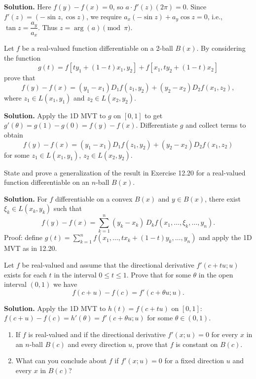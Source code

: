 \noindent\textbf{Solution.}
Here $f(y)-f(x)=0$, so $a\cdot f'(z)(2\pi)=0$. Since $f'(z)=(-\sin z,\cos z)$, we require $a_x(-\sin z)+a_y\cos z=0$, i.e., $\tan z=\dfrac{a_y}{a_x}$. Thus $z=\arg(a)\pmod{\pi}$.

\begin{problembox}
Let \( f \) be a real-valued function differentiable on a 2-ball \( B(x) \). By considering the function
\[g(t) = f[ty_1 + (1 - t)x_1, y_2] + f[x_1, ty_2 + (1 - t)x_2]\]
prove that
\[f(y) - f(x) = (y_1 - x_1)D_1f(z_1, y_2) + (y_2 - x_2)D_2f(x_1, z_2),\]
where \( z_1 \in L(x_1, y_1) \) and \( z_2 \in L(x_2, y_2) \).
\end{problembox}

\noindent\textbf{Solution.}
Apply the 1D MVT to $g$ on $[0,1]$ to get $g'(\theta)=g(1)-g(0)=f(y)-f(x)$. Differentiate $g$ and collect terms to obtain
\[f(y)-f(x)=(y_1-x_1)D_1 f(z_1,y_2)+(y_2-x_2)D_2 f(x_1,z_2)\]
for some $z_1\in L(x_1,y_1)$, $z_2\in L(x_2,y_2)$.

\begin{problembox}
State and prove a generalization of the result in Exercise 12.20 for a real-valued function differentiable on an \( n \)-ball \( B(x) \).
\end{problembox}

\noindent\textbf{Solution.}
For $f$ differentiable on a convex $B(x)$ and $y\in B(x)$, there exist $\xi_k\in L(x_k,y_k)$ such that
\[f(y)-f(x)=\sum_{k=1}^n (y_k-x_k)\,D_k f(x_1,\dots,\xi_k,\dots,y_n).\]
Proof: define $g(t)=\sum_{k=1}^n f(x_1,\dots,tx_k+(1-t)y_k,\dots,y_n)$ and apply the 1D MVT as in 12.20.

\begin{problembox}
Let \( f \) be real-valued and assume that the directional derivative \( f'(c + tu; u) \) exists for each \( t \) in the interval \( 0 \leq t \leq 1 \). Prove that for some \( \theta \) in the open interval \( (0, 1) \) we have
\[f(c + u) - f(c) = f'(c + \theta u; u).\]
\end{problembox}

\noindent\textbf{Solution.}
Apply the 1D MVT to $h(t)=f(c+tu)$ on $[0,1]$: $f(c+u)-f(c)=h'(\theta)=f'(c+\theta u;u)$ for some $\theta\in(0,1)$.

\begin{problembox}
\begin{enumerate}[label=(\alph*)]
\item If \( f \) is real-valued and if the directional derivative \( f'(x; u) = 0 \) for every \( x \) in an \( n \)-ball \( B(c) \) and every direction \( u \), prove that \( f \) is constant on \( B(c) \).
\item What can you conclude about \( f \) if \( f'(x; u) = 0 \) for a fixed direction \( u \) and every \( x \) in \( B(c) \)?
\end{enumerate}
\end{problembox}


